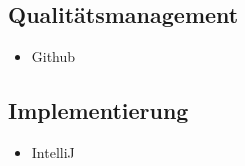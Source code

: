 \subsection{Qualitätsmanagement}
\begin{itemize}
	\item Github
\end{itemize}
 
\subsection{Implementierung}
\begin{itemize}
	\item IntelliJ
\end{itemize}


